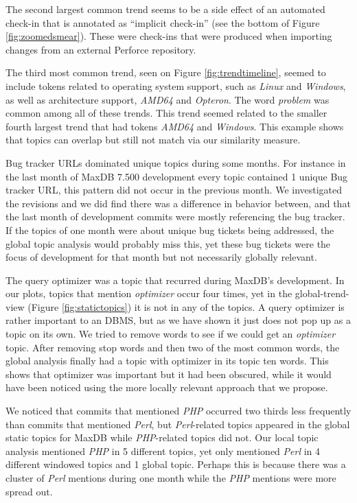 \documentclass[times, 10pt,twocolumn]{article}
\begin{document}
The second largest common trend seems to be a side effect of an
automated check-in that is annotated as ``implicit check-in'' (see
the bottom of Figure \ref{fig:zoomedsmear}). These were check-ins that
were produced when importing changes from an external Perforce
repository.

The third most common trend, seen on Figure \ref{fig:trendtimeline},
seemed to include tokens related to operating system support, such as
\emph{Linux} and \emph{Windows}, as well as architecture support, \emph{AMD64} and
\emph{Opteron}. The word \emph{problem} was common among all of these
trends. This trend seemed related to the smaller fourth largest trend
that had tokens \emph{AMD64} and \emph{Windows}. This example shows that
topics can overlap but still not match via our similarity measure.


Bug tracker URLs dominated unique topics during some months. For
instance in the last month of MaxDB 7.500 development every topic
contained 1 unique Bug tracker URL, this pattern did not occur in the
previous month. We investigated the revisions and we did find
there was a difference in behavior between, and that the last month of
development commits were mostly referencing the bug tracker. If the
topics of one month were about unique bug tickets being
addressed, the global topic analysis would probably miss this, yet these
bug tickets were the focus of development for that month but not
necessarily globally relevant.

The query optimizer was a topic that recurred during MaxDB's
development. In our plots, topics that mention \emph{optimizer} occur four
times, yet in the global-trend-view (Figure \ref{fig:statictopics}) it
is not in any of the topics. A query optimizer is rather important to
an DBMS, but as we have shown it just does not pop up as a topic on
its own. We tried to remove words to see if we could get an 
\emph{optimizer} topic. After removing stop words and then two of the most
common words, the global analysis finally had a topic with optimizer in
its topic ten words. This shows that optimizer was important but it
had been obscured, while it would have been noticed using the more
locally relevant approach that we propose.

We noticed that commits that mentioned \emph{PHP} occurred two thirds
less frequently than commits that mentioned \emph{Perl}, but
\emph{Perl}-related topics appeared in the global static topics for
MaxDB while \emph{PHP}-related topics did not.  Our local topic
analysis mentioned \emph{PHP} in 5 different topics, yet only
mentioned \emph{Perl} in 4 different windowed topics and 1 global
topic. Perhaps this is because there was a cluster of \emph{Perl}
mentions during one month while the \emph{PHP} mentions were more
spread out.
\end{document}
